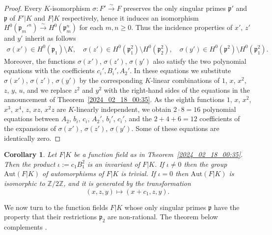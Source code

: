 \documentclass[12pt,reqno]{amsart}
\newtheorem{cor}[thm]{Corollary}
\theoremstyle{definition}
\newcommand{\Z}{\mathbb{Z}}
\newcommand{\pp}{\mathfrak{p}}
\newcommand{\sig}{\sigma}
\begin{document}
\begin{proof}
Every $K$-isomorphism $\sig:F' \overset\sim\to F$ preserves the only singular primes $\pp'$ and $\pp$ of $F'|K$ and $F|K$ respectively, hence it induces an isomorphism $H^0(\pp_m'^n) \overset\sim\to H^0(\pp_m^n)$ for each $m,n \geq 0$.
Thus the incidence properties of $x'$, $z'$ and $y'$ inherit as follows
\begin{align*}
    \sig(x') \in H^0(\pp_1) \setminus K , \quad
    \sig(z') \in H^0(\pp_1^2) \setminus H^0(\pp_2^2), \quad
    \sig(y') \in H^0(\pp^2) \setminus H^0(\pp_1^2).
\end{align*}
Moreover, the functions $\sig(x')$, $\sig(z')$, $\sig(y')$ also satisfy the two polynomial equations with the coefficients $c_i',B_i',A_2'$.
In these equations we substitute $\sig(x')$, $\sig(z')$, $\sig(y')$ by the corresponding $K$-linear combinations of $1$, $x$, $x^2$, $z$, $y$, $u$, and we replace $z^2$ and $y^2$ with the right-hand sides of the equations in the announcement of Theorem~\ref{2024_02_18_00:35}.
As the eighth functions $1$, $x$, $x^2$, $x^3$, $x^4$, $z$, $xz$, $x^2 z$ are $K$-linearly independent, we obtain $2\cdot 8 = 16$ polynomial equations between $A_2$, $b_i$, $c_i$, $A_2'$, $b_i'$, $c_i'$, and the $2 + 4 + 6 = 12$ coefficients of the expansions of $\sig(x')$, $\sig(z')$, $\sig(y')$.
Some of these equations are identically zero.
\end{proof}


\begin{cor}\label{2024_03_25_11:50}
Let $F|K$ be a function field as in Theorem~\ref{2024_02_18_00:35}.
Then the product $\iota := c_1 B_1^2$ is an invariant of $F|K$.
If $\iota \neq 0$ then the group $\mathrm{Aut}(F|K)$ of automorphisms of $F|K$ is trivial.
If $\iota = 0$ then $\mathrm{Aut}(F|K)$ is isomorphic to $\Z/2\Z$, and it is generated by the transformation
\[ (x,z,y) \mapsto (x + c_1, z, y). \]
\end{cor}


We now turn to the function fields $F|K$ whose only singular primes $\pp$ have the property that their restrictions $\pp_2$ are non-rational.
The theorem below complements \cite[Theorem~3.1~(ii)]{HiSt23}.
\end{document}
